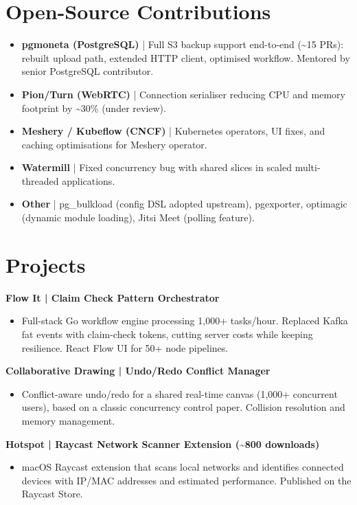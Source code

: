 \documentclass[a4paper,10pt]{article}
\newcommand{\project}[1]{%
    {\fontsize{7.5}{9.5}\selectfont\textbf{#1}}\\[0.2mm]%
}
\begin{document}
\section{Open-Source Contributions}
\begin{itemize}
    \item \textbf{pgmoneta (PostgreSQL)} | Full S3 backup support end-to-end (\textasciitilde 15 PRs): rebuilt upload path, extended HTTP client, optimised workflow. Mentored by senior PostgreSQL contributor.
    \item \textbf{Pion/Turn (WebRTC)} | Connection serialiser reducing CPU and memory footprint by \textasciitilde 30\% (under review).
    \item \textbf{Meshery / Kubeflow (CNCF)} | Kubernetes operators, UI fixes, and caching optimisations for Meshery operator.
    \item \textbf{Watermill} | Fixed concurrency bug with shared slices in scaled multi-threaded applications.
    \item \textbf{Other} | pg\_bulkload (config DSL adopted upstream), pgexporter, optimagic (dynamic module loading), Jitsi Meet (polling feature).
\end{itemize}

\section{Projects}

\project{Flow It | Claim Check Pattern Orchestrator}
\begin{itemize}
    \item Full-stack Go workflow engine processing 1,000+ tasks/hour. Replaced Kafka fat events with claim-check tokens, cutting server costs while keeping resilience. React Flow UI for 50+ node pipelines.
\end{itemize}

\project{Collaborative Drawing | Undo/Redo Conflict Manager}
\begin{itemize}
    \item Conflict-aware undo/redo for a shared real-time canvas (1,000+ concurrent users), based on a classic concurrency control paper. Collision resolution and memory management.
\end{itemize}

\project{Hotspot | Raycast Network Scanner Extension (\textasciitilde 800 downloads)}
\begin{itemize}
    \item macOS Raycast extension that scans local networks and identifies connected devices with IP/MAC addresses and estimated performance. Published on the Raycast Store.
\end{itemize}
\end{document}
